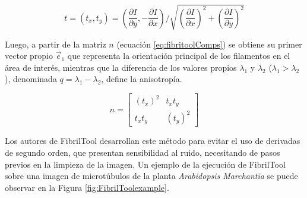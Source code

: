 \begin{equation}
\label{eq:fibritoolTensor}
t = (t_x,t_y) = (
\dfrac{\partial I}{\partial y}, -\frac{\partial I}{\partial x}) / \sqrt{  
(\frac{\partial I}{\partial x})^2 + 
(\frac{\partial I}{\partial y})^2 }
\end{equation}

Luego, a partir de la matriz $n$ (ecuaci\'on \ref{eq:fibritoolComps}) se obtiene su primer vector propio $\Vec{e}_1$ que representa la orientaci\'on principal de los filamentos en el \'area de inter\'es, mientras que la diferencia de los valores propios $\lambda_1$ y $\lambda_2$ ($\lambda_1 > \lambda_2$), denominada $q = \lambda_1 - \lambda_2$, define la anisotrop\'ia.


\begin{equation}
n =
\begin{bmatrix}
(t_x)^2 & t_x t_y \\
t_x t_y & (t_y)^2 
\end{bmatrix}
\label{eq:fibritoolComps}
\end{equation}

Los autores de FibrilTool desarrollan este m\'etodo para evitar el uso de derivadas de segundo orden, que presentan sensibilidad al ruido, necesitando de pasos previos en la limpieza de la imagen. Un ejemplo de la ejecuci\'on de FibrilTool sobre una imagen de microt\'ubulos de la planta {\it Arabidopsis Marchantia} se puede observar en  la Figura \ref{fig:FibrilToolexample}.  

